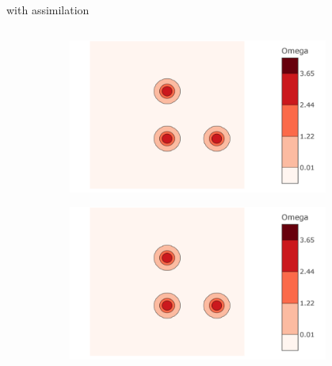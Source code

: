 \documentclass[aspectratio=169]{beamer} %
\begin{document}
\begin{frame}{with assimilation}
    \begin{columns}
        \begin{column}{0.5\textwidth}
            \begin{figure}
                \centering
                \begin{subfigure}{\textwidth}
                    \centering
                    \includegraphics[width=\textwidth]{images/vorticity_field.png}
                \end{subfigure}
                \begin{subfigure}{\textwidth}
                    \centering
                    \includegraphics[width=\textwidth]{images/vorticity_field.png}
                \end{subfigure}
            \end{figure}
        \end{column}
        \begin{column}{0.5\textwidth}

\end{column}
\end{columns}
\end{frame}
\end{document}
